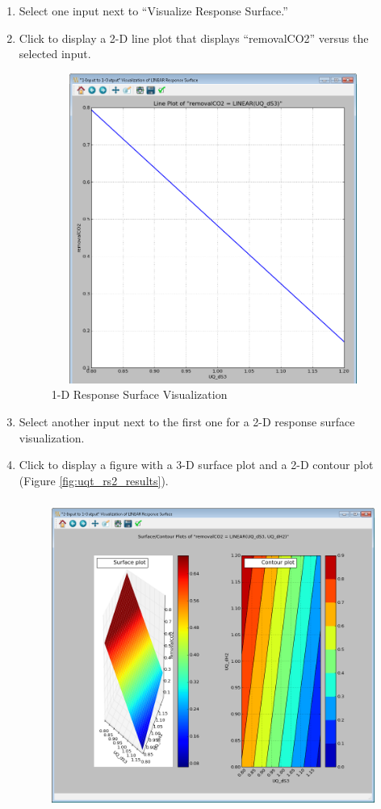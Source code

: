 \begin{enumerate}
\item{Select one input next to ``Visualize Response Surface.''}
\item{Click  to display a 2-D line plot that displays ``removalCO2'' versus the selected
input.
\begin{figure}[H]
\centering \includegraphics[width=6.5in,height=4in,keepaspectratio]{Chapt_uq/figs/tutorial/26_1DRSVis}
\caption{1-D Response Surface Visualization }
\label{fig:uqt_rs1_results}
\end{figure}
}
\item{Select another input next to the first one for a 2-D response surface visualization.}
\item{Click  to display a figure with a 3-D surface plot and a 2-D contour plot (Figure \ref{fig:uqt_rs2_results}).\\
\begin{figure}[H]
\centering \includegraphics[width=6.5in,height=4in,keepaspectratio]{Chapt_uq/figs/tutorial/27_2DRSVis}

\end{figure}}
\end{enumerate}
